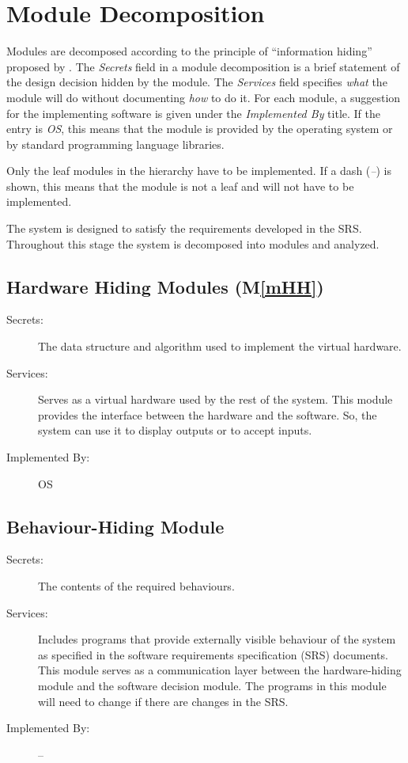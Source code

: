 \documentclass[12pt, titlepage]{article}
\newcommand{\mref}[1]{M\ref{#1}}
\begin{document}
\section{Module Decomposition} \label{SecMD}

Modules are decomposed according to the principle of ``information hiding''
proposed by \citet{ParnasEtAl1984}. The \emph{Secrets} field in a module
decomposition is a brief statement of the design decision hidden by the
module. The \emph{Services} field specifies \emph{what} the module will do
without documenting \emph{how} to do it. For each module, a suggestion for the
implementing software is given under the \emph{Implemented By} title. If the
entry is \emph{OS}, this means that the module is provided by the operating
system or by standard programming language libraries. 

Only the leaf modules in the
hierarchy have to be implemented. If a dash (\emph{--}) is shown, this means
that the module is not a leaf and will not have to be implemented. 

The system is designed to satisfy the requirements developed in the SRS. Throughout
this stage the system is decomposed into modules and analyzed.

\subsection{Hardware Hiding Modules (\mref{mHH})}

\begin{description}
\item[Secrets:]The data structure and algorithm used to implement the virtual
  hardware.
\item[Services:]Serves as a virtual hardware used by the rest of the
  system. This module provides the interface between the hardware and the
  software. So, the system can use it to display outputs or to accept inputs.
\item[Implemented By:] OS
\end{description}

\subsection{Behaviour-Hiding Module}

\begin{description}
\item[Secrets:]The contents of the required behaviours.
\item[Services:]Includes programs that provide externally visible behaviour of
  the system as specified in the software requirements specification (SRS)
  documents. This module serves as a communication layer between the
  hardware-hiding module and the software decision module. The programs in this
  module will need to change if there are changes in the SRS.
\item[Implemented By:] --
\end{description}
\end{document}
